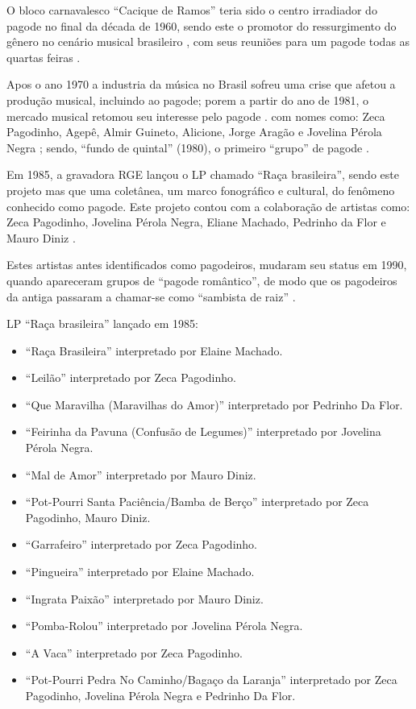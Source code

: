 \begin{description}
O bloco carnavalesco ``Cacique de Ramos'' teria sido o centro irradiador do pagode no final da década de 1960,
sendo este o promotor do ressurgimento do gênero no cenário musical brasileiro \cite{sedano2018bezerra},
com seus reuniões  para um pagode todas as quartas feiras  \cite[pp. 210]{diniz2006almanaque}.

Apos o ano 1970 a industria da música no Brasil sofreu uma crise que afetou a produção musical, 
incluindo ao pagode;
porem a partir do ano de 1981, o mercado musical retomou seu interesse pelo pagode \cite{sedano2018bezerra}.
com nomes como: Zeca Pagodinho, Agepê, Almir Guineto, Alicione, 
Jorge Aragão e Jovelina Pérola Negra \cite[pp. 130]{perna2002samba} \cite{sedano2018bezerra};
sendo, ``fundo de quintal'' (1980), o primeiro ``grupo'' de pagode \cite[pp. 130]{perna2002samba} \cite{fundodequintal}.

Em 1985, a gravadora RGE lançou o LP chamado  ``Raça brasileira'', 
sendo este projeto mas que uma coletânea, um marco fonográfico e cultural,
do fenômeno conhecido como pagode. Este projeto contou com a colaboração de artistas como:
Zeca Pagodinho, 
Jovelina Pérola Negra, 
Eliane Machado,
Pedrinho da Flor e
Mauro Diniz \cite[pp. 211]{diniz2006almanaque}.

Estes artistas antes identificados como pagodeiros, mudaram seu status em 1990, 
 quando apareceram grupos de ``pagode romântico'', 
de modo que os pagodeiros da antiga passaram a chamar-se como ``sambista de raiz''  \cite{sedano2018bezerra}. 

\begin{example} LP ``Raça brasileira'' lançado em 1985:

\begin{itemize}
\item ``Raça Brasileira'' interpretado por Elaine Machado.
\item ``Leilão'' interpretado por Zeca Pagodinho.
\item ``Que Maravilha (Maravilhas do Amor)'' interpretado por Pedrinho Da Flor.
\item ``Feirinha da Pavuna (Confusão de Legumes)'' interpretado por Jovelina Pérola Negra.
\item ``Mal de Amor''  interpretado por  Mauro Diniz.
\item ``Pot-Pourri Santa Paciência/Bamba de Berço'' interpretado por Zeca Pagodinho, Mauro Diniz.
\item ``Garrafeiro'' interpretado por Zeca Pagodinho.
\item ``Pingueira'' interpretado por Elaine Machado.
\item ``Ingrata Paixão'' interpretado por Mauro Diniz.
\item ``Pomba-Rolou'' interpretado por  Jovelina Pérola Negra.
\item ``A Vaca'' interpretado por Zeca Pagodinho.
\item ``Pot-Pourri Pedra No Caminho/Bagaço da Laranja'' interpretado por Zeca Pagodinho, Jovelina Pérola Negra e Pedrinho Da Flor.
\end{itemize}
\end{example}


\end{description}
